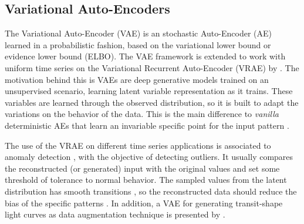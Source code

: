 \subsection{Variational Auto-Encoders}
The Variational Auto-Encoder (VAE) is an stochastic Auto-Encoder (AE) learned in a probabilistic fashion, based on the variational lower bound or evidence lower bound (ELBO). 
The VAE framework \citep{kingma2013auto} is extended to work with uniform time series on the Variational Recurrent Auto-Encoder (VRAE) by \citep{fabius2014variational}. 
The motivation behind this is VAEs are deep generative models trained on an unsupervised scenario, learning latent variable representation as it trains. These variables are learned through the observed distribution, so it is built to adapt the variations on the behavior of the data. 
This is the main difference to \textit{vanilla} deterministic AEs that learn an invariable specific point for the input pattern \citep{vincent2010stacked}.

The use of the VRAE on different time series applications is associated to anomaly detection \citep{park2018multimodal,guo2018multidimensional,xu2018unsupervised}, with the objective of detecting outliers. It usually compares the reconstructed (or generated) input with the original values and set some threshold of tolerance to normal behavior. 
The sampled values from the latent distribution has smooth transitions \citep{kingma2013auto}, so the reconstructed data should reduce the bias of the specific patterns \citep{xu2018unsupervised}.
In addition, a VAE for generating transit-shape light curves as data augmentation technique is presented by \citep{woodward2019generating}.


